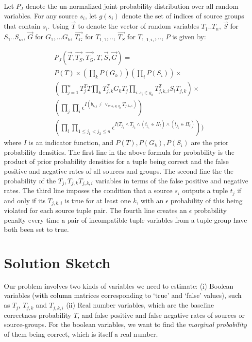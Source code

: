 \documentclass{sig-alternate}
\newcounter{prob}
\begin{document}
Let $P_J$ denote the un-normalized joint probability distribution over all random variables. For any source $s_i$, let $g(s_i)$ denote the set of indices of source groups that contain $s_i$. 
Using $\overrightarrow{T}$ to denote the vector of random variables $T_1..T_n$, $\overrightarrow{S}$ for $S_1..S_m$, $\overrightarrow{G}$ for $G_1, ... G_k$,  $\overrightarrow{T_G}$ for $T_{1, 1}, ..$, $\overrightarrow{T_S}$ for $T_{1, 1, i_1}, ..$, $P$ is given by:

\begin{align*} 
& P_J(\overrightarrow{T}, \overrightarrow{T_S}, \overrightarrow{T_G}, T, \overrightarrow{S}, \overrightarrow{G}) =
\\& P(T) \times (\prod_{k} P(G_k)) (\prod_{i} P(S_i)) \times
\\& (\prod_{j=1}^{n} T_{j}^{T}T \prod_{k} T_{j, k}^{T}G_kT_j \prod_{i:s_i\in g_k} T_{j,k,i}^{T}S_iT_{j,k}) \times 
\\& (\prod_{j} \prod_{i} \epsilon^{I(b_{i,j} \neq \lor_{k : s_i \in g_k} T_{j,k,i})})
\\& (\prod_{l} \prod_{1 \leq j_1 < j_2 \leq n} \epsilon^{I(T_{j_1} \land T_{j_2} \land (t_{j_1}\in H_l) \land (t_{j_2} \in H_l)}))
\end{align*}
where $I$ is an indicator function, and $P(T), P(G_k), P(S_i)$ are the prior probability densities. The first line in the above formula for probability is the product of prior probability densities for a tuple being correct and the false positive and negative rates of all sources and groups. The second line the the probability of the $T_j, T_{j,k} T_{j,k,i}$ variables in terms of the false positive and negative rates. The third line imposes the condition that a source $s_i$ outputs a tuple $t_j$ if and only if its $T_{j,k,i}$ is true for at least one $k$, with an $\epsilon$ probability of this being violated for each source tuple pair. The fourth line creates an $\epsilon$ probability penalty every time a pair of incompatible tuple variables from a tuple-group have both been set to true.

\section{Solution Sketch}
Our problem involves two kinds of variables we need to estimate: (i) Boolean variables (with column matrices corresponding to `true' and `false' values), such as $T_j$, $T_{j,k}$ and $T_{j,k,i}$ (ii) Real number variables, which are the baseline correctness probability $T$, and false positive and false negative rates of sources or source-groups. For the boolean variables, we want to find the \textit{marginal probability} of them being correct, which is itself a real number. 
\end{document}
